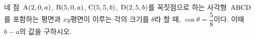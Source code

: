 네 점~$\mathrm{A}(2{,}\mkern3mu\mathopen{}0{,}\mkern3mu\mathopen{}a)$, $\mathrm{B}(5{,}\mkern3mu\mathopen{}0{,}\mkern3mu\mathopen{}a)$, $\mathrm{C}(5{,}\mkern3mu\mathopen{}5{,}\mkern3mu\mathopen{}b)$, $\mathrm{D}(2{,}\mkern3mu\mathopen{}5{,}\mkern3mu\mathopen{}b)$를 꼭짓점으로 하는 사각형~$\mathrm{ABCD}$를 포함하는 평면과 $xy$평면이 이루는 각의 크기를 $\theta$라 할 때, $\cos\theta=\dfrac{5}{8}$이다. 이때 $b-a$의 값을 구하시오. 

